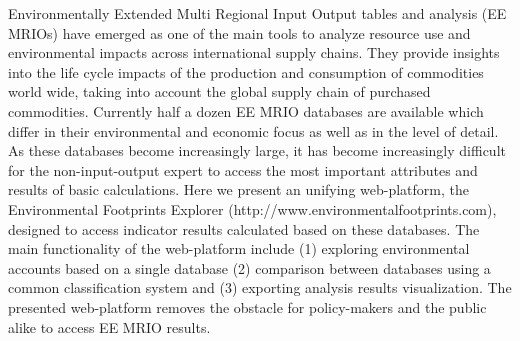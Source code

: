 Environmentally Extended Multi Regional Input Output tables and analysis (EE MRIOs) have emerged as one of the main tools to analyze resource use and environmental impacts across international supply chains. They provide insights into the life cycle impacts of the production and consumption of commodities world wide, taking into account the global supply chain of purchased commodities. Currently half a dozen EE MRIO databases are available which differ in their environmental and economic focus as well as in the level of detail. As these databases become increasingly large, it has become increasingly difficult for the non-input-output expert to access the most important attributes and results of basic calculations. Here we present an unifying web-platform, the Environmental Footprints Explorer (http://www.environmentalfootprints.com), designed to access indicator results calculated based on these databases. The main functionality of the web-platform include (1) exploring environmental accounts based on a single database (2) comparison between databases using a common classification system and (3) exporting analysis results visualization. The presented web-platform removes the obstacle for policy-makers and the public alike to access EE MRIO results. 


    